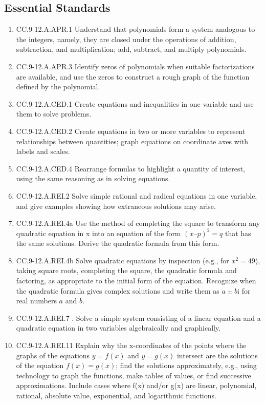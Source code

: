 \documentclass{article}
\begin{document}
\subsection*{Essential Standards}
\begin{enumerate}
	\item CC.9-12.A.APR.1  Understand that polynomials form a system analogous to the integers, namely, they are closed under the operations of addition, subtraction, and multiplication; add, subtract, and multiply polynomials.
	\item CC.9-12.A.APR.3  Identify zeros of polynomials when suitable factorizations are available, and use the zeros to construct a rough graph of the function defined by the polynomial.
	\item CC.9-12.A.CED.1  Create equations and inequalities in one variable and use them to solve problems. 
	\item CC.9-12.A.CED.2  Create equations in two or more variables to represent relationships between quantities; graph equations on coordinate axes with labels and scales.
	\item CC.9-12.A.CED.4  Rearrange formulas to highlight a quantity of interest, using the same reasoning as in solving equations. 
	\item CC.9-12.A.REI.2 Solve simple rational and radical equations in one variable, and give examples showing how extraneous solutions may arise.
	\item CC.9-12.A.REI.4a Use the method of completing the square to transform any quadratic equation in x into an equation of the form $(x – p)^2 = q$ that has the same solutions. Derive the quadratic formula from this form. 
	\item CC.9-12.A.REI.4b Solve quadratic equations by inspection (e.g., for $x^2 = 49$), taking square roots, completing the square, the quadratic formula and factoring, as appropriate to the initial form of the equation. Recognize when the quadratic formula gives complex solutions and write them as $a \pm b\textrm{i}$ for real numbers $a$ and $b$.
	\item CC.9-12.A.REI.7 . Solve a simple system consisting of a linear equation and a quadratic equation in two variables algebraically and graphically. 
	\item CC.9-12.A.REI.11  Explain why the x-coordinates of the points where the graphs of the equations $y = f(x)$ and $y = g(x)$ intersect are the solutions of the equation $f(x) = g(x)$; find the solutions approximately, e.g., using technology to graph the functions, make tables of values, or find successive approximations. Include cases where f(x) and/or g(x) are linear, polynomial, rational, absolute value, exponential, and logarithmic functions.

\end{enumerate}
\end{document}
